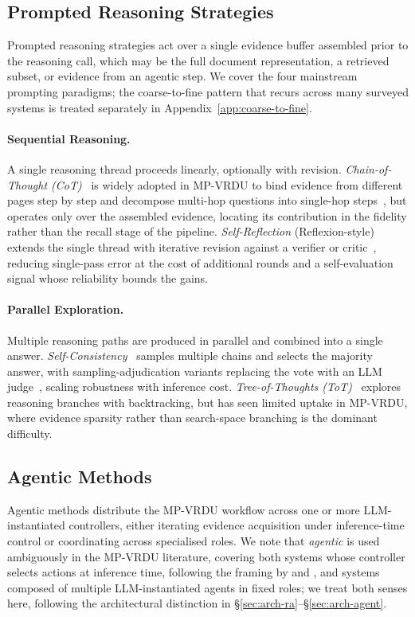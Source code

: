 \documentclass[11pt]{article}
\begin{document}
\subsection{Prompted Reasoning Strategies}
\label{sec:tf-reasoning}
Prompted reasoning strategies act over a single evidence buffer assembled prior to the reasoning call, which may be the full document representation, a retrieved subset, or evidence from an agentic step. We cover the four mainstream prompting paradigms; the coarse-to-fine pattern that recurs across many surveyed systems is treated separately in Appendix~\ref{app:coarse-to-fine}.

\paragraph{Sequential Reasoning.}
A single reasoning thread proceeds linearly, optionally with revision. \emph{Chain-of-Thought (CoT)}~\cite{wei2022chain} is widely adopted in MP-VRDU to bind evidence from different pages step by step and decompose multi-hop questions into single-hop steps~\cite{jia2024leopard, xu2026mmr5}, but operates only over the assembled evidence, locating its contribution in the fidelity rather than the recall stage of the pipeline. \emph{Self-Reflection} (Reflexion-style)~\cite{shinn2023reflexion} extends the single thread with iterative revision against a verifier or critic~\cite{jain2025simpledoc, wang2025vidorag}, reducing single-pass error at the cost of additional rounds and a self-evaluation signal whose reliability bounds the gains.

\paragraph{Parallel Exploration.}
Multiple reasoning paths are produced in parallel and combined into a single answer. \emph{Self-Consistency}~\cite{wang2022self} samples multiple chains and selects the majority answer, with sampling-adjudication variants replacing the vote with an LLM judge~\cite{zhu2025doclens}, scaling robustness with inference cost. \emph{Tree-of-Thoughts (ToT)}~\cite{yao2023tree} explores reasoning branches with backtracking, but has seen limited uptake in MP-VRDU, where evidence sparsity rather than search-space branching is the dominant difficulty.

\subsection{Agentic Methods}
\label{sec:agentic-methods}
Agentic methods distribute the MP-VRDU workflow across one or more LLM-instantiated controllers, either iterating evidence acquisition under inference-time control or coordinating across specialised roles. We note that \textit{agentic} is used ambiguously in the MP-VRDU literature, covering both systems whose controller selects actions at inference time, following the framing by \citeauthor{plaat2025agentic} and \citeauthor{wang2024survey}, and systems composed of multiple LLM-instantiated agents in fixed roles; we treat both senses here, following the architectural distinction in \S\ref{sec:arch-ra}–\S\ref{sec:arch-agent}.
\end{document}
